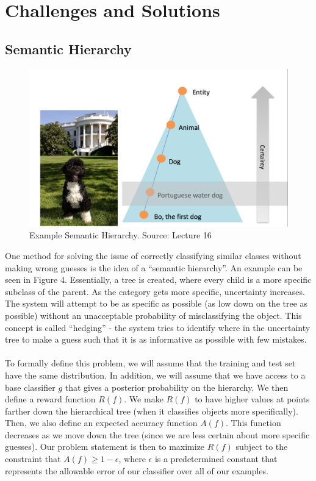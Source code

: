 \documentclass[11pt]{article}
\begin{document}
\section{Challenges and Solutions}
\subsection{Semantic Hierarchy}
\begin{figure}[h]
  \centering
  \includegraphics[scale=0.6]{bo.png}
  \caption{Example Semantic Hierarchy. Source: Lecture 16}
\end{figure}
One method for solving the issue of correctly classifying similar classes without making wrong guesses is the idea of a ``semantic hierarchy''. An example can be seen in Figure 4. Essentially, a tree is created, where every child is a more specific subclass of the parent. As the category gets more specific, uncertainty increases. The system will attempt to be as specific as possible (as low down on the tree as possible) without an unacceptable probability of misclassifying the object. This concept is called ``hedging'' - the system tries to identify where in the uncertainty tree to make a guess such that it is as informative as possible with few mistakes.\\ \\ 
To formally define this problem, we will assume that the training and test set have the same distribution. In addition, we will assume that we have access to a base classifier $g$ that gives a posterior probability on the hierarchy. We then define a reward function $R(f)$. We make $R(f)$ to have higher values at points farther down the hierarchical tree (when it classifies objects more specifically). Then, we also define an expected accuracy function $A(f)$. This function decreases as we move down the tree (since we are less certain about more specific guesses). Our problem statement is then to maximize $R(f)$ subject to the constraint that $A(f) \ge 1 - \epsilon$, where $\epsilon$ is a predetermined constant that represents the allowable error of our classifier over all of our examples.\\ \\
\end{document}
